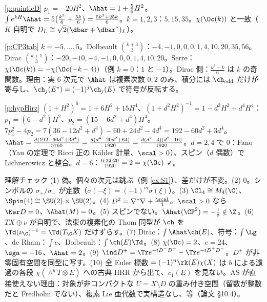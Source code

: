 \begin{sol}{\ref{p:quinticD}}
$p_1=-20H^2$、$\Ahat=1+\frac56H^2$。$\int e^{kH}\Ahat=5\bigl(\frac{k^3}6+\frac{5k}6\bigr)=\frac{5k^3+25k}6$。$k=1,2,3$：$5,15,35$。$\chi(\Oc(k))$ と一致（$K$ 自明で $D_L\cong\sqrt2(\dbar+\dbar^*)_L$）。
\end{sol}
\begin{sol}{\ref{p:CP3tab}}
$k=-5,\dots,5$。Dolbeault $\binom{k+3}3$：$-4,-1,0,0,0,1,4,10,20,35,56$。Dirac $\binom{k+1}3$：$-20,-10,-4,-1,0,0,0,1,4,10,20$。Serre：$\chi(\Oc(k))=-\chi(\Oc(-k-4))$（例 $k=0$：$1$ と $-1$）。Dirac 側：$\frac{k^3-k}6$ は $k$ の奇関数。理由：実 6 次元で $\Ahat$ は複素次数 $0,2$ のみ、積分には $\ch_{\rm odd}$ だけが寄与し、$\ch_j(E^*)=(-1)^j\ch_j(E)$ で符号が反転する。
\end{sol}
\begin{sol}{\ref{p:hypHirz}}
$(1+H^2)^6=1+6H^2+15H^4$、$(1+d^2H^2)^{-1}=1-d^2H^2+d^4H^4$：$p_1=(6-d^2)H^2$、$p_2=(15-6d^2+d^4)H^4$。$7p_1^2-4p_2=7(36-12d^2+d^4)-60+24d^2-4d^4=192-60d^2+3d^4$。$\Ahat=\frac{d(192-60d^2+3d^4)}{5760}=\frac{d(d^4-20d^2+64)}{1920}=\frac{d(d^2-4)(d^2-16)}{1920}$。$d=2,4$ で $0$：Fano（Yau の定理で Ricci 正の Kähler 計量、$\scal>0$）、スピン（$d$ 偶数）で Lichnerowicz と整合。$d=6$：$\frac{6\cdot32\cdot20}{1920}=2=\chi(\Oc)$ ✓。
\end{sol}
\begin{sol}{理解チェック}
(1) 偽。個々の次元は跳ぶ（例 \ref{ex:S1}）、差だけが不変。(2) $0$。シンボルの $\sigma_+/\sigma_-$ が定数（$\sigma(-\xi)=(-1)^m\sigma(\xi)$）。(3) $\Cl_4\cong M_4(\C)$、$\Spin(4)\cong\SU(2)\times\SU(2)$。(4) $D^2=\nabla^*\nabla+\frac{\scal}4$。$\scal>0$ なら $\Ker D=0$、$\Ahat(M)=0$。(5) スピンでない。$\Ahat(\CP^2)=-\frac18\notin\Z$。(6) $TX\oplus\nu$ が自明で、法束の複素化の Thom 同型が $\ch$ を $\Td(\nu_{\C})^{-1}=\Td(T_{\C}X)$ だけずらす。(7) Dirac：$\int\Ahat\ch(E)$、符号：$\int\Lg$、de Rham：$\int e$、Dolbeault：$\int\ch(E)\Td$。(8) $\chi(\Oc)=2$、$e=24$、$\sgn=-16$、$\Ahat=2$。(9) $\ind D^+=\Tr e^{-tD^-D^+}-\Tr e^{-tD^+D^-}$。$D^+$ が非零固有空間を同型に写す。(10) 全 Euler 標数 $=(-1)^n\rk(E)\chi(X)$ は $b$ による濾過の各段 $\chi(\wedge^bT\otimes E)$ への古典 HRR から出て、$c_1(E)$ を見ない。AS が直接使えない理由：対象が非コンパクトな $U=X\setminus D$ の重み付き空間（留数が整数だと Fredholm でない）、複素 Lie 亜代数で実構造なし、等（論文 \S10.4）。
\end{sol}

